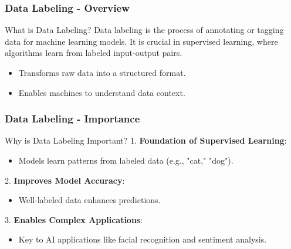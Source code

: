 \documentclass[aspectratio=169]{beamer}
\begin{document}
\begin{frame}[fragile]
    \frametitle{Data Labeling - Overview}
    \begin{block}{What is Data Labeling?}
        Data labeling is the process of annotating or tagging data for machine learning models. 
        It is crucial in supervised learning, where algorithms learn from labeled input-output pairs.
        \begin{itemize}
            \item Transforms raw data into a structured format.
            \item Enables machines to understand data context.
        \end{itemize}
    \end{block}
\end{frame}

\begin{frame}[fragile]
    \frametitle{Data Labeling - Importance}
    \begin{block}{Why is Data Labeling Important?}
        1. \textbf{Foundation of Supervised Learning}:
            \begin{itemize}
                \item Models learn patterns from labeled data (e.g., "cat," "dog").
            \end{itemize}
        2. \textbf{Improves Model Accuracy}:
            \begin{itemize}
                \item Well-labeled data enhances predictions.
            \end{itemize}
        3. \textbf{Enables Complex Applications}:
            \begin{itemize}
                \item Key to AI applications like facial recognition and sentiment analysis.
            \end{itemize}
    \end{block}
\end{frame}
\end{document}
